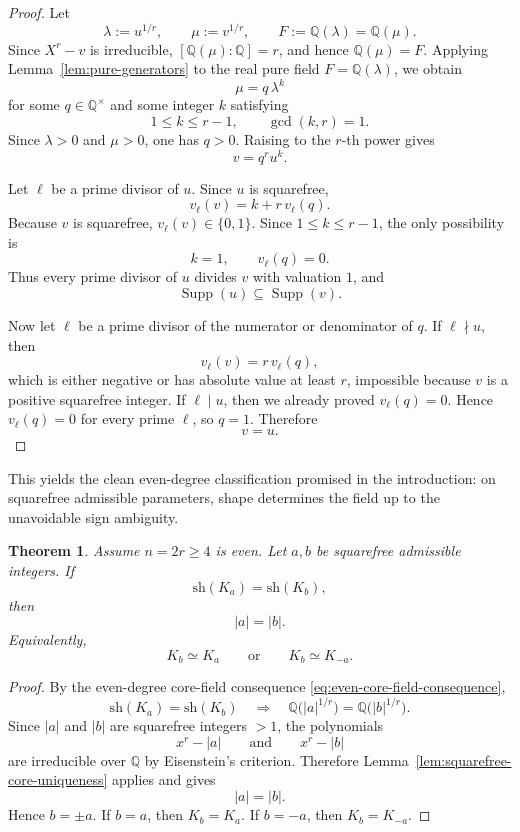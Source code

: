 \documentclass[11pt,letterpaper]{amsart}
\newcommand{\Q}{\mathbb{Q}}
\newcommand{\sh}{\mathrm{sh}}
\theoremstyle{plain}
\newtheorem{theorem}{Theorem}[section]
\theoremstyle{definition}
\begin{document}
\begin{proof}
Let
\[
\lambda:=u^{1/r},
\qquad
\mu:=v^{1/r},
\qquad
F:=\Q(\lambda)=\Q(\mu).
\]
Since \(X^r-v\) is irreducible, \([\Q(\mu):\Q]=r\), and hence
\(\Q(\mu)=F\).  Applying Lemma~\ref{lem:pure-generators} to the real pure field
\(F=\Q(\lambda)\), we obtain
\[
\mu=q\,\lambda^k
\]
for some \(q\in\Q^\times\) and some integer \(k\) satisfying
\[
1\le k\le r-1,
\qquad
\gcd(k,r)=1.
\]
Since \(\lambda>0\) and \(\mu>0\), one has \(q>0\).  Raising to the \(r\)-th
power gives
\[
v=q^r u^k.
\]

Let \(\ell\) be a prime divisor of \(u\).  Since \(u\) is squarefree,
\[
v_\ell(v)=k+r\,v_\ell(q).
\]
Because \(v\) is squarefree, \(v_\ell(v)\in\{0,1\}\).  Since
\(1\le k\le r-1\), the only possibility is
\[
k=1,
\qquad
v_\ell(q)=0.
\]
Thus every prime divisor of \(u\) divides \(v\) with valuation \(1\), and
\[
\operatorname{Supp}(u)\subseteq \operatorname{Supp}(v).
\]

Now let \(\ell\) be a prime divisor of the numerator or denominator of \(q\).
If \(\ell\nmid u\), then
\[
v_\ell(v)=r\,v_\ell(q),
\]
which is either negative or has absolute value at least \(r\), impossible
because \(v\) is a positive squarefree integer.  If \(\ell\mid u\), then we
already proved \(v_\ell(q)=0\).  Hence \(v_\ell(q)=0\) for every prime
\(\ell\), so \(q=1\).  Therefore
\[
v=u.
\]
\end{proof}

This yields the clean even-degree classification promised in the introduction: on squarefree admissible parameters, shape determines the field up to the unavoidable sign ambiguity.

\begin{theorem}
\label{thm:shape-complete-squarefree-up-to-sign}
Assume \(n=2r\ge 4\) is even. Let \(a,b\) be squarefree admissible integers.
If
\[
\sh(K_a)=\sh(K_b),
\]
then
\[
|a|=|b|.
\]
Equivalently,
\[
K_b\simeq K_a
\qquad\text{or}\qquad
K_b\simeq K_{-a}.
\]
\end{theorem}

\begin{proof}
By the even-degree core-field consequence \eqref{eq:even-core-field-consequence},
\[
\sh(K_a)=\sh(K_b)
\quad\Longrightarrow\quad
\Q\!\bigl(|a|^{1/r}\bigr)=\Q\!\bigl(|b|^{1/r}\bigr).
\]
Since \(|a|\) and \(|b|\) are squarefree integers \(>1\), the polynomials
\[
x^r-|a|
\qquad\text{and}\qquad
x^r-|b|
\]
are irreducible over \(\Q\) by Eisenstein's criterion.
Therefore Lemma~\ref{lem:squarefree-core-uniqueness} applies and gives
\[
|a|=|b|.
\]
Hence \(b=\pm a\).
If \(b=a\), then \(K_b=K_a\).
If \(b=-a\), then \(K_b=K_{-a}\).
\end{proof}
\end{document}

